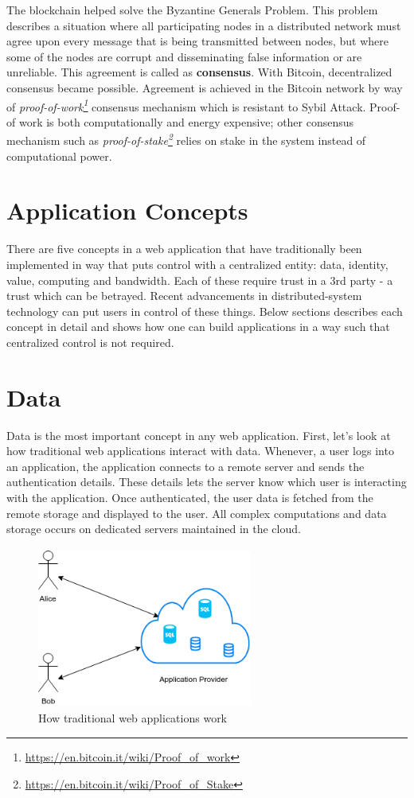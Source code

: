 	The blockchain helped solve the Byzantine Generals Problem\cite{lamport1982byzantine}. This problem describes a situation where all participating nodes in a distributed network must agree upon every message that is being transmitted between nodes, but where some of the nodes are corrupt and disseminating false information or are unreliable. This agreement is called as \textbf{consensus}. With Bitcoin\cite{nakamoto2008bitcoin}, decentralized consensus became possible. Agreement is achieved in the Bitcoin network by way of \textit{proof-of-work\footnote{\url{https://en.bitcoin.it/wiki/Proof_of_work}}} consensus mechanism which is resistant to Sybil Attack\cite{douceur2002sybil}. Proof-of work is both computationally and energy expensive; other consensus mechanism such as \textit{proof-of-stake\footnote{\url{https://en.bitcoin.it/wiki/Proof_of_Stake}}} relies on stake in the system instead of computational power.
	
\section{Application Concepts}
	There are five concepts in a web application that have traditionally been implemented in way that puts control with a centralized entity: data, identity, value, computing and bandwidth\cite{raval2016decentralized}. Each of these require trust in a 3rd party - a trust which can be betrayed. Recent advancements in distributed-system technology can put users in control of these things. Below sections describes each concept in detail and shows how one can build applications in a way such that centralized control is not required.

\section{Data}
	Data is the most important concept in any web application. First, let's look at how traditional web applications interact with data. Whenever, a user logs into an application, the application connects to a remote server and sends the authentication details. These details lets the server know which user is interacting with the application. Once authenticated, the user data is fetched from the remote storage and displayed to the user. All complex computations and data storage occurs on dedicated servers maintained in the cloud.
		
	\begin{figure}[h]
		\centering
		\includegraphics[width=200pt, height=150pt]{figures/traditional-app}
		\caption{\label{fig:traditional-app} How traditional web applications work}
	\end{figure}
		
